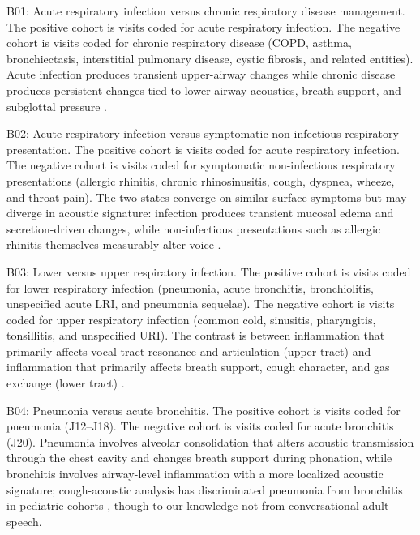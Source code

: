 \documentclass[utf8]{FrontiersinHarvard} %
\begin{document}
B01: Acute respiratory infection versus chronic respiratory disease management. The positive cohort is visits coded for acute respiratory infection. The negative cohort is visits coded for chronic respiratory disease (COPD, asthma, bronchiectasis, interstitial pulmonary disease, cystic fibrosis, and related entities). Acute infection produces transient upper-airway changes while chronic disease produces persistent changes tied to lower-airway acoustics, breath support, and subglottal pressure \citep{copd-asthma-voice-acoustics,copd-asthma-voice-acoustics-2,lri-breath-support-prosody}.

B02: Acute respiratory infection versus symptomatic non-infectious respiratory presentation. The positive cohort is visits coded for acute respiratory infection. The negative cohort is visits coded for symptomatic non-infectious respiratory presentations (allergic rhinitis, chronic rhinosinusitis, cough, dyspnea, wheeze, and throat pain). The two states converge on similar surface symptoms but may diverge in acoustic signature: infection produces transient mucosal edema and secretion-driven changes, while non-infectious presentations such as allergic rhinitis themselves measurably alter voice \citep{infection-noninfection-voice-distinction}.

B03: Lower versus upper respiratory infection. The positive cohort is visits coded for lower respiratory infection (pneumonia, acute bronchitis, bronchiolitis, unspecified acute LRI, and pneumonia sequelae). The negative cohort is visits coded for upper respiratory infection (common cold, sinusitis, pharyngitis, tonsillitis, and unspecified URI). The contrast is between inflammation that primarily affects vocal tract resonance and articulation (upper tract) and inflammation that primarily affects breath support, cough character, and gas exchange (lower tract) \citep{nasal-coupling-spectral,lri-breath-support-prosody}.

B04: Pneumonia versus acute bronchitis. The positive cohort is visits coded for pneumonia (J12--J18). The negative cohort is visits coded for acute bronchitis (J20). Pneumonia involves alveolar consolidation that alters acoustic transmission through the chest cavity and changes breath support during phonation, while bronchitis involves airway-level inflammation with a more localized acoustic signature; cough-acoustic analysis has discriminated pneumonia from bronchitis in pediatric cohorts \citep{pneumonia-vs-bronchitis-acoustic,pneumonia-vs-bronchitis-acoustic-2,pneumonia-vs-bronchitis-acoustic-3}, though to our knowledge not from conversational adult speech.
\end{document}
